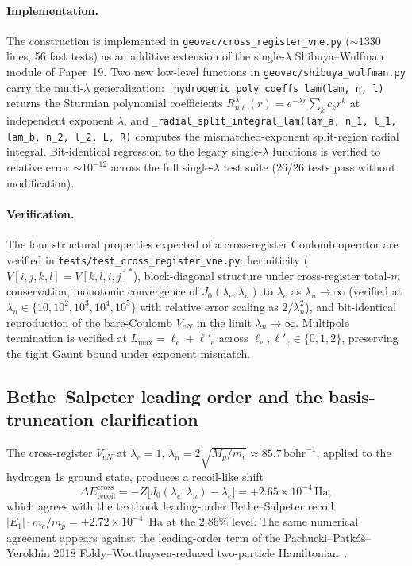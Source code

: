 \documentclass[twocolumn,prc,amsmath,amssymb,superscriptaddress]{revtex4-2}
\begin{document}
\paragraph{Implementation.}
The construction is implemented in \texttt{geovac/cross\_register\_vne.py}
($\sim 1330$ lines, 56 fast tests) as an additive extension of the
single-$\lambda$ Shibuya--Wulfman module of Paper~19. Two new low-level
functions in \texttt{geovac/shibuya\_wulfman.py} carry the multi-$\lambda$
generalization: \texttt{\_hydrogenic\_poly\_coeffs\_lam(lam, n, l)}
returns the Sturmian polynomial coefficients
$R^\lambda_{n\ell}(r) = e^{-\lambda r}\sum_k c_k r^k$ at independent
exponent $\lambda$, and
\texttt{\_radial\_split\_integral\_lam(lam\_a, n\_1, l\_1, lam\_b, n\_2,
l\_2, L, R)} computes the mismatched-exponent split-region radial
integral. Bit-identical regression to the legacy single-$\lambda$
functions is verified to relative error $\sim 10^{-12}$ across the full
single-$\lambda$ test suite (26/26 tests pass without modification).

\paragraph{Verification.}
The four structural properties expected of a cross-register Coulomb
operator are verified in \texttt{tests/test\_cross\_register\_vne.py}:
hermiticity ($V[i,j,k,l] = V[k,l,i,j]^*$), block-diagonal structure
under cross-register total-$m$ conservation, monotonic convergence of
$J_0(\lambda_e, \lambda_n)$ to $\lambda_e$ as $\lambda_n \to \infty$
(verified at $\lambda_n \in \{10, 10^2, 10^3, 10^4, 10^5\}$ with
relative error scaling as $2/\lambda_n^2$), and bit-identical
reproduction of the bare-Coulomb $V_{eN}$ in the limit
$\lambda_n \to \infty$. Multipole termination is verified at
$L_{\max} = \ell_e + \ell'_e$ across $\ell_e, \ell'_e \in \{0,1,2\}$,
preserving the tight Gaunt bound under exponent mismatch.

\subsection{Bethe--Salpeter leading order and the basis-truncation
clarification}
\label{ssec:cross-bethe}

The cross-register $V_{eN}$ at $\lambda_e = 1$, $\lambda_n =
2\sqrt{M_p / m_e} \approx 85.7\,\mathrm{bohr}^{-1}$, applied to the
hydrogen 1s ground state, produces a recoil-like shift
\begin{equation}
  \Delta E_{\mathrm{recoil}}^{\mathrm{cross}}
  = -Z \big[J_0(\lambda_e, \lambda_n) - \lambda_e\big]
  = +2.65 \times 10^{-4}\,\mathrm{Ha},
\label{eq:recoil-cross}
\end{equation}
which agrees with the textbook leading-order Bethe--Salpeter recoil
$|E_1| \cdot m_e/m_p = +2.72 \times 10^{-4}$~Ha at the
$2.86\%$ level. The same numerical agreement appears against the
leading-order term of the Pachucki--Patkó\v{s}--Yerokhin 2018
Foldy--Wouthuysen-reduced two-particle
Hamiltonian~\cite{Pachucki2018}.
\end{document}

